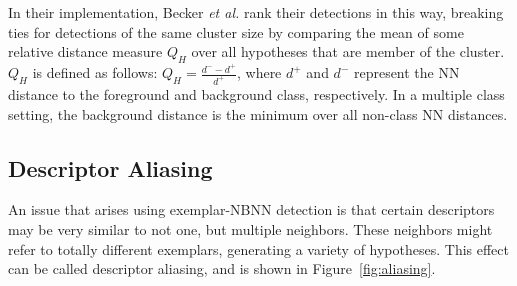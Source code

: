 In their implementation, Becker \emph{et al.} \cite{becker2012codebook} rank their detections in this way, breaking ties for detections of the same cluster size by comparing the mean of some relative distance measure $Q_H$ over all hypotheses that are member of the cluster. $Q_H$ is defined as follows: $Q_H=\frac{d^- - d^+}{d^+}$, where $d^+$ and $d^-$ represent the NN distance to the foreground and background class, respectively. In a multiple class setting, the background distance is the minimum over all non-class NN distances.

\subsection{Descriptor Aliasing} %
\label{sec:descriptor_aliasing}

An issue that arises using exemplar-NBNN detection is that certain descriptors may be very similar to not one, but multiple neighbors. These neighbors might refer to totally different exemplars, generating a variety of hypotheses. This effect can be called descriptor aliasing, and is shown in Figure~\ref{fig:aliasing}.


